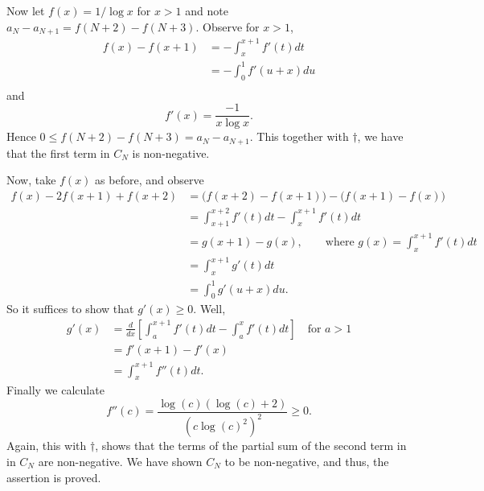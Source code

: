 \documentclass{homework}
\begin{document}
\begin{solution}
Now let $f(x) = 1/\log x$ for $x>1$ and note $a_N - a_{N+1} = f(N+2) - f(N+3)$. Observe for $x>1$,
\begin{align*}
  f(x) - f(x+1) 
  &= -\int_x^{x+1} f'(t)dt\\
  &= -\int_0^1 f'(u+x)du\\
\end{align*}
and 
$$
  f'(x) = \frac{-1}{x\log x}.
$$
Hence $0 \le f(N+2) - f(N+3) = a_N - a_{N+1}.$ This together with $\dagger$, we have that the first term in $C_N$ is non-negative.

Now, take $f(x)$ as before, and observe
\begin{align*}
  f(x) - 2f(x+1) + f(x+2)
  &= \big(f(x+2) - f(x+1)\big) - \big(f(x+1) - f(x)\big)\\
  &= \int_{x+1}^{x+2} f'(t)dt - \int_x^{x+1}f'(t)dt\\
  &= g(x+1) - g(x),\quad\quad\text{where }g(x) = \int_x^{x+1}f'(t)dt\\
  &= \int_x^{x+1} g'(t) dt \\
  &= \int_0^1 g'(u+x)du. 
\end{align*}
So it suffices to show that $g'(x) \ge 0$. Well,
\begin{align*}
  g'(x) &= \frac{d}{dx}\left[ \int_a^{x+1} f'(t)dt - \int_a^xf'(t)dt\right]\quad \text{for }a>1\\
  &= f'(x+1) - f'(x) \\
  &= \int_x^{x+1} f''(t)dt.
\end{align*}
Finally we calculate 
$$
  f''(c) = \frac{\log(c)(\log(c) + 2)}{\left(c\log(c)^2\right)^2} \ge 0.
$$
Again, this with $\dagger$, shows that the terms of the partial sum of the second term in in $C_N$ are non-negative.  We have shown $C_N$ to be non-negative, and thus, the assertion is proved.
\end{solution}
\end{document}
